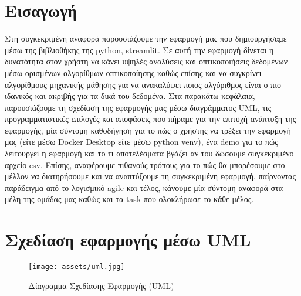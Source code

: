 \documentclass[a4paper,12pt]{article}
\begin{document}
\section{Εισαγωγή}
Στη συγκεκριμένη αναφορά παρουσιάζουμε την εφαρμογή μας που δημιουργήσαμε μέσω της βιβλιοθήκης της  python, streamlit. Σε αυτή την εφαρμογή δίνεται η δυνατότητα στον χρήστη να κάνει υψηλές αναλύσεις και οπτικοποιήσεις δεδομένων μέσω ορισμένων αλγορίθμων οπτικοποίησης καθώς επίσης και να συγκρίνει αλγορίθμους μηχανικής μάθησης για να ανακαλύψει ποιος αλγόριθμος είναι ο πιο ιδανικός και ακριβής για τα δικά του δεδομένα. Στα παρακάτω κεφάλαια, παρουσιάζουμε τη σχεδίαση της εφαρμογής μας μέσω διαγράμματος UML, τις προγραμματιστικές επιλογές και αποφάσεις που πήραμε για την επιτυχή ανάπτυξη της εφαρμογής, μία σύντομη καθοδήγηση για το πώς ο χρήστης να τρέξει την εφαρμογή μας (είτε μέσω Docker Desktop είτε μέσω python venv), ένα demo για το πώς λειτουργεί η εφαρμογή και το τι αποτελέσματα βγάζει αν του δώσουμε συγκεκριμένο αρχείο csv. Επίσης, αναφέρουμε πιθανούς τρόπους για το πώς θα μπορέσουμε στο μέλλον να διατηρήσουμε και να αναπτύξουμε τη συγκεκριμένη εφαρμογή, παίρνοντας παράδειγμα από το λογισμικό agile και τέλος, κάνουμε μία σύντομη αναφορά στα μέλη της ομάδας μας καθώς και τα task που ολοκλήρωσε το κάθε μέλος.



\newpage


\section{Σχεδίαση εφαρμογής μέσω UML }
\begin{figure}[h!]
  \centering
  \texttt{[image: assets/uml.jpg]}
  \caption{Δίαγραμμα Σχεδίασης Εφαρμογής (UML)}
  \label{fig:uml}
\end{figure}
\end{document}

